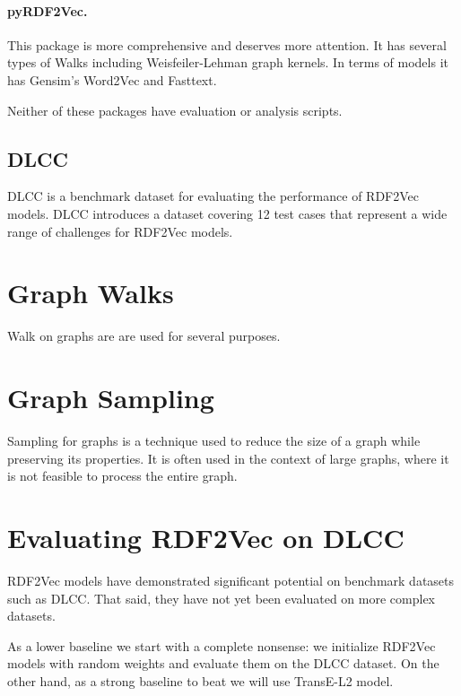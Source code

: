 \documentclass[a4paper,oneside,bibliography=totoc]{scrartcl}
\begin{document}
\paragraph{pyRDF2Vec.} This package is more comprehensive and deserves more attention. 
It has several types of Walks including Weisfeiler-Lehman graph kernels. 
In terms of models it has Gensim's Word2Vec and Fasttext.

Neither of these packages have evaluation or analysis scripts. 





\subsection{DLCC}
DLCC is a benchmark dataset for evaluating the performance of RDF2Vec models. 
DLCC introduces a dataset covering 12 test cases that represent a wide range of challenges for RDF2Vec models. 



\section{Graph Walks}

Walk on graphs are are used for several purposes. 


\section{Graph Sampling}
Sampling for graphs is a technique used to reduce the size of a graph while preserving its properties. 
It is often used in the context of large graphs, where it is not feasible to process the entire graph.



\section{Evaluating RDF2Vec on DLCC}
RDF2Vec models have demonstrated significant potential on benchmark datasets such as DLCC. 
That said, they have not yet been evaluated on more complex datasets.

As a lower baseline we start with a complete nonsense: we initialize RDF2Vec models with random weights and evaluate them on the DLCC dataset.
On the other hand, as a strong baseline to beat we will use TransE-L2 model. 
\end{document}
